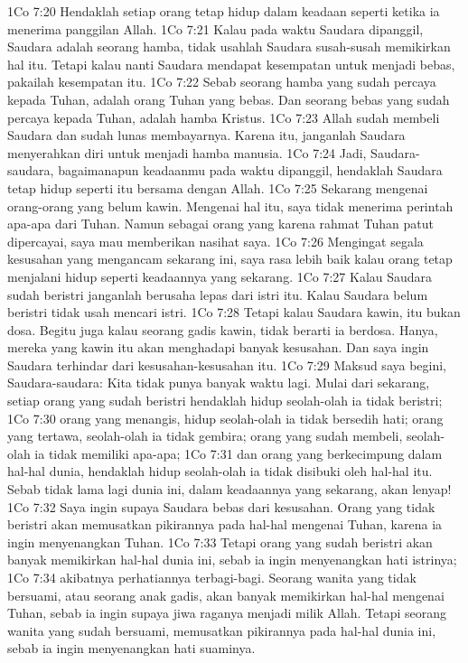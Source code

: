 1Co 7:20  Hendaklah setiap orang tetap hidup dalam keadaan seperti ketika ia menerima panggilan Allah.
1Co 7:21  Kalau pada waktu Saudara dipanggil, Saudara adalah seorang hamba, tidak usahlah Saudara susah-susah memikirkan hal itu. Tetapi kalau nanti Saudara mendapat kesempatan untuk menjadi bebas, pakailah kesempatan itu.
1Co 7:22  Sebab seorang hamba yang sudah percaya kepada Tuhan, adalah orang Tuhan yang bebas. Dan seorang bebas yang sudah percaya kepada Tuhan, adalah hamba Kristus.
1Co 7:23  Allah sudah membeli Saudara dan sudah lunas membayarnya. Karena itu, janganlah Saudara menyerahkan diri untuk menjadi hamba manusia.
1Co 7:24  Jadi, Saudara-saudara, bagaimanapun keadaanmu pada waktu dipanggil, hendaklah Saudara tetap hidup seperti itu bersama dengan Allah.
1Co 7:25  Sekarang mengenai orang-orang yang belum kawin. Mengenai hal itu, saya tidak menerima perintah apa-apa dari Tuhan. Namun sebagai orang yang karena rahmat Tuhan patut dipercayai, saya mau memberikan nasihat saya.
1Co 7:26  Mengingat segala kesusahan yang mengancam sekarang ini, saya rasa lebih baik kalau orang tetap menjalani hidup seperti keadaannya yang sekarang.
1Co 7:27  Kalau Saudara sudah beristri janganlah berusaha lepas dari istri itu. Kalau Saudara belum beristri tidak usah mencari istri.
1Co 7:28  Tetapi kalau Saudara kawin, itu bukan dosa. Begitu juga kalau seorang gadis kawin, tidak berarti ia berdosa. Hanya, mereka yang kawin itu akan menghadapi banyak kesusahan. Dan saya ingin Saudara terhindar dari kesusahan-kesusahan itu.
1Co 7:29  Maksud saya begini, Saudara-saudara: Kita tidak punya banyak waktu lagi. Mulai dari sekarang, setiap orang yang sudah beristri hendaklah hidup seolah-olah ia tidak beristri;
1Co 7:30  orang yang menangis, hidup seolah-olah ia tidak bersedih hati; orang yang tertawa, seolah-olah ia tidak gembira; orang yang sudah membeli, seolah-olah ia tidak memiliki apa-apa;
1Co 7:31  dan orang yang berkecimpung dalam hal-hal dunia, hendaklah hidup seolah-olah ia tidak disibuki oleh hal-hal itu. Sebab tidak lama lagi dunia ini, dalam keadaannya yang sekarang, akan lenyap!
1Co 7:32  Saya ingin supaya Saudara bebas dari kesusahan. Orang yang tidak beristri akan memusatkan pikirannya pada hal-hal mengenai Tuhan, karena ia ingin menyenangkan Tuhan.
1Co 7:33  Tetapi orang yang sudah beristri akan banyak memikirkan hal-hal dunia ini, sebab ia ingin menyenangkan hati istrinya;
1Co 7:34  akibatnya perhatiannya terbagi-bagi. Seorang wanita yang tidak bersuami, atau seorang anak gadis, akan banyak memikirkan hal-hal mengenai Tuhan, sebab ia ingin supaya jiwa raganya menjadi milik Allah. Tetapi seorang wanita yang sudah bersuami, memusatkan pikirannya pada hal-hal dunia ini, sebab ia ingin menyenangkan hati suaminya.
